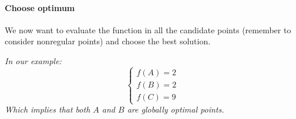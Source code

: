 \paragraph{Choose optimum} We now want to evaluate the function in all the candidate points (remember to consider nonregular points) and choose the best solution.

\textit{In our example:
$$
\begin{cases}
	f(A) = 2 \\
	f(B) = 2 \\
	f(C) = 9
\end{cases}
$$
Which implies that both $A$ and $B$ are globally optimal points.}
